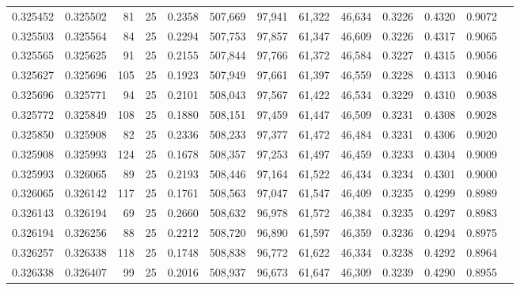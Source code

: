 \begin{tabular}{rrrrrrrrrrrrr}
0.325452 & 0.325502 &    81 &  25 &                                     0.2358 & 507,669 &  97,941 &  61,322 &  46,634 & 0.3226 & 0.4320 & 0.9072 \\
0.325503 & 0.325564 &    84 &  25 &                                     0.2294 & 507,753 &  97,857 &  61,347 &  46,609 & 0.3226 & 0.4317 & 0.9065 \\
0.325565 & 0.325625 &    91 &  25 &                                     0.2155 & 507,844 &  97,766 &  61,372 &  46,584 & 0.3227 & 0.4315 & 0.9056 \\
0.325627 & 0.325696 &   105 &  25 &                                     0.1923 & 507,949 &  97,661 &  61,397 &  46,559 & 0.3228 & 0.4313 & 0.9046 \\
0.325696 & 0.325771 &    94 &  25 &                                     0.2101 & 508,043 &  97,567 &  61,422 &  46,534 & 0.3229 & 0.4310 & 0.9038 \\
0.325772 & 0.325849 &   108 &  25 &                                     0.1880 & 508,151 &  97,459 &  61,447 &  46,509 & 0.3231 & 0.4308 & 0.9028 \\
0.325850 & 0.325908 &    82 &  25 &                                     0.2336 & 508,233 &  97,377 &  61,472 &  46,484 & 0.3231 & 0.4306 & 0.9020 \\
0.325908 & 0.325993 &   124 &  25 &                                     0.1678 & 508,357 &  97,253 &  61,497 &  46,459 & 0.3233 & 0.4304 & 0.9009 \\
0.325993 & 0.326065 &    89 &  25 &                                     0.2193 & 508,446 &  97,164 &  61,522 &  46,434 & 0.3234 & 0.4301 & 0.9000 \\
0.326065 & 0.326142 &   117 &  25 &                                     0.1761 & 508,563 &  97,047 &  61,547 &  46,409 & 0.3235 & 0.4299 & 0.8989 \\
0.326143 & 0.326194 &    69 &  25 &                                     0.2660 & 508,632 &  96,978 &  61,572 &  46,384 & 0.3235 & 0.4297 & 0.8983 \\
0.326194 & 0.326256 &    88 &  25 &                                     0.2212 & 508,720 &  96,890 &  61,597 &  46,359 & 0.3236 & 0.4294 & 0.8975 \\
0.326257 & 0.326338 &   118 &  25 &                                     0.1748 & 508,838 &  96,772 &  61,622 &  46,334 & 0.3238 & 0.4292 & 0.8964 \\
0.326338 & 0.326407 &    99 &  25 &                                     0.2016 & 508,937 &  96,673 &  61,647 &  46,309 & 0.3239 & 0.4290 & 0.8955 \\

\end{tabular}
